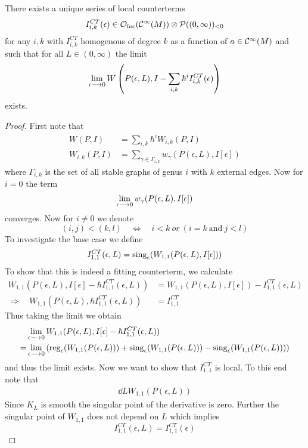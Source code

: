 \begin{theo}
  There exists a unique series of local counterterms
  $$ I_{i,k}^{CT}(\epsilon) \in \OO_{loc}(\Ci(M)) \otimes \mathcal{P}((0,\infty))_{<0} $$
  for any $i,k$ with $I_{i,k}^{CT}$ homogenous of degree $k$ as a function of $a \in \mathcal{C}^{\infty}(M)$ and such that for all $L \in (0,\infty)$ the limit
  $$ \lim_{\epsilon \lra 0} W\left(P(\epsilon, L), I - \sum_{i,k} \hbar^i I_{i,k}^{CT}(\epsilon)\right) $$
  exists.
\begin{proof}
  First note that
  \begin{align}
    W(P,I) &= \sum_{i,k} \hbar^i W_{i,k}(P,I) \\
    W_{i,k}(P,I) &= \sum_{\gamma \in \Gamma_{i,k}} w_\gamma (P(\epsilon, L), I[\epsilon])
  \end{align}
  where $\Gamma_{i,k}$ is the set of all stable graphs of genus $i$ with $k$ external edges. Now for $i = 0$ the term
  $$ \lim_{\epsilon \lra 0} w_\gamma (P(\epsilon, L), I[\epsilon])$$
  converges. Now for $i\neq 0$ we denote
  $$ (i,j) < (k,l) \quad \Leftrightarrow \quad i<k \ or \ (i=k \ \text{and} \ j<l) $$
  To investigate the base case we define
  $$ I_{1,1}^{CT}(\epsilon, L) = \sing_\epsilon(W_{1,1}(P(\epsilon, L), I[\epsilon])) $$
  To show that this is indeed a fitting counterterm, we calculate
  \begin{align}
    W_{1,1}(P(\epsilon,L), I[\epsilon] - \hbar I_{1,1}^{CT}(\epsilon,L)) &= W_{1,1}(P(\epsilon,L), I[\epsilon]) - I_{1,1}^{CT}(\epsilon,L)\\
    \Rightarrow \quad W_{1,1}(P(\epsilon,L), \hbar I_{1,1}^{CT}(\epsilon,L)) &= I_{1,1}^{CT}
  \end{align}
  Thus taking the limit we obtain
  \begin{align}
    &\lim_{\epsilon \lra 0} W_{1,1}(P(\epsilon,L), I[\epsilon] - \hbar I_{1,1}^{CT}(\epsilon,L)) \\
    = &\lim_{\epsilon \lra 0} \left( \reg_\epsilon(W_{1,1}(P(\epsilon,L))) + \sing_\epsilon(W_{1,1}(P(\epsilon,L))) - \sing_\epsilon(W_{1,1}(P(\epsilon,L))) \right)
  \end{align}
  and thus the limit exists. Now we want to show that $I_{1,1}^{CT}$ is local. To this end note that
  \begin{align}
    \dd{}{L} W_{1,1}(P(\epsilon,L))
  \end{align}
  Since $K_L$ is smooth the singular point of the derivative is zero. Further the singular point of $W_{1,1}$ does not depend on $L$ which implies
  $$ I_{1,1}^{CT}(\epsilon, L) = I_{1,1}^{CT}(\epsilon) $$

\end{proof}
\end{theo}
